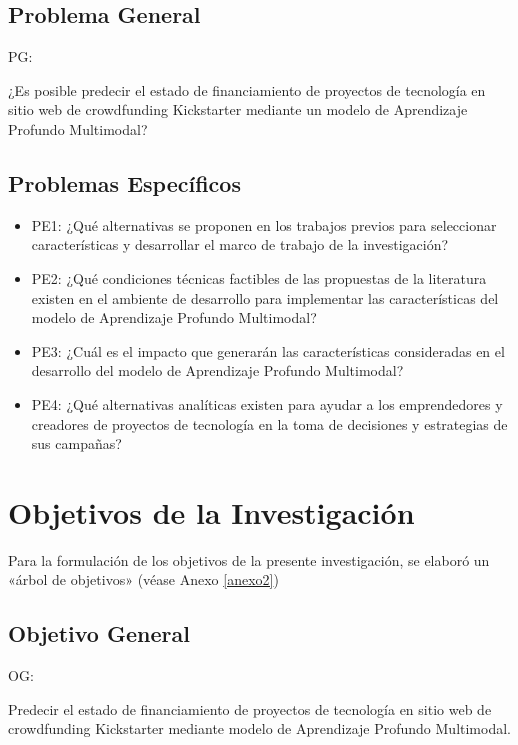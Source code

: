 \subsection{Problema General}
PG: \newcommand{\ProblemaGeneral}{
¿Es posible predecir el estado de financiamiento de proyectos de tecnología en sitio web de crowdfunding Kickstarter mediante un modelo de Aprendizaje Profundo Multimodal?
}
\ProblemaGeneral
\subsection{Problemas Específicos}
\newcommand{\Pbone}{
¿Qué alternativas se proponen en los trabajos previos para seleccionar características y desarrollar el marco de trabajo de la investigación?
}
\newcommand{\Pbtwo}{
¿Qué condiciones técnicas factibles de las propuestas de la literatura existen en el ambiente de desarrollo para implementar las características del modelo de Aprendizaje Profundo Multimodal?
}
\newcommand{\Pbthree}{
¿Cuál es el impacto que generarán las características consideradas en el desarrollo del modelo de Aprendizaje Profundo Multimodal?
}
\newcommand{\Pbfour}{
¿Qué alternativas analíticas existen para ayudar a los emprendedores y creadores de proyectos de tecnología en la toma de decisiones y estrategias de sus campañas?
}

\begin{itemize}
	\item PE1: {\Pbone}
	\item PE2: {\Pbtwo}
	\item PE3: {\Pbthree}
	\item PE4: {\Pbfour}
\end{itemize}

\section{Objetivos de la Investigación}
Para la formulación de los objetivos de la presente investigación, se elaboró un «árbol de objetivos» (véase Anexo \ref{anexo2}) 
\subsection{Objetivo General}
OG: \newcommand{\ObjetivoGeneral}{
Predecir el estado de financiamiento de proyectos de tecnología en sitio web de crowdfunding Kickstarter mediante modelo de Aprendizaje Profundo Multimodal.
}
\ObjetivoGeneral
